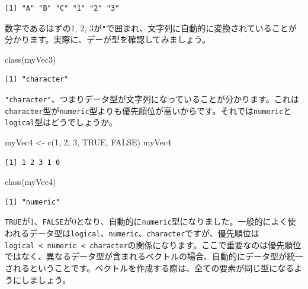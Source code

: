 \documentclass[
  a4paper,
  pandoc,
  ja=standard,
  jafont=haranoaji]{bxjsbook}
\newenvironment{Shaded}{\begin{snugshade}}{\end{snugshade}}
\newcommand{\ConstantTok}[1]{\textcolor[rgb]{0.56,0.35,0.01}{#1}}
\newcommand{\DecValTok}[1]{\textcolor[rgb]{0.68,0.00,0.00}{#1}}
\newcommand{\FunctionTok}[1]{\textcolor[rgb]{0.28,0.35,0.67}{#1}}
\newcommand{\NormalTok}[1]{\textcolor[rgb]{0.00,0.48,0.65}{#1}}
\newcommand{\OtherTok}[1]{\textcolor[rgb]{0.00,0.48,0.65}{#1}}
\begin{document}
\begin{verbatim}
[1] "A" "B" "C" "1" "2" "3"
\end{verbatim}

数字であるはずの1, 2,
3が\texttt{"}で囲まれ、文字列に自動的に変換されていることが分かります。実際に、デーが型を確認してみましょう。

\begin{Shaded}
\begin{Highlighting}[numbers=left,,]
\FunctionTok{class}\NormalTok{(myVec3)}
\end{Highlighting}
\end{Shaded}

\begin{verbatim}
[1] "character"
\end{verbatim}

\texttt{"character"}、つまりデータ型が文字列になっていることが分かります。これは\texttt{character}型が\texttt{numeric}型よりも優先順位が高いからです。それでは\texttt{numeric}と\texttt{logical}型はどうでしょうか。

\begin{Shaded}
\begin{Highlighting}[numbers=left,,]
\NormalTok{myVec4 }\OtherTok{\textless{}{-}} \FunctionTok{c}\NormalTok{(}\DecValTok{1}\NormalTok{, }\DecValTok{2}\NormalTok{, }\DecValTok{3}\NormalTok{, }\ConstantTok{TRUE}\NormalTok{, }\ConstantTok{FALSE}\NormalTok{)}
\NormalTok{myVec4}
\end{Highlighting}
\end{Shaded}

\begin{verbatim}
[1] 1 2 3 1 0
\end{verbatim}

\begin{Shaded}
\begin{Highlighting}[numbers=left,,]
\FunctionTok{class}\NormalTok{(myVec4)}
\end{Highlighting}
\end{Shaded}

\begin{verbatim}
[1] "numeric"
\end{verbatim}

\texttt{TRUE}が1、\texttt{FALSE}が0となり、自動的に\texttt{numeric}型になりました。一般的によく使われるデータ型は\texttt{logical}、\texttt{numeric}、\texttt{character}ですが、優先順位は\texttt{logical\ \textless{}\ numeric\ \textless{}\ character}の関係になります。ここで重要なのは優先順位ではなく、異なるデータ型が含まれるベクトルの場合、自動的にデータ型が統一されるということです。ベクトルを作成する際は、全ての要素が同じ型になるようにしましょう。
\end{document}
